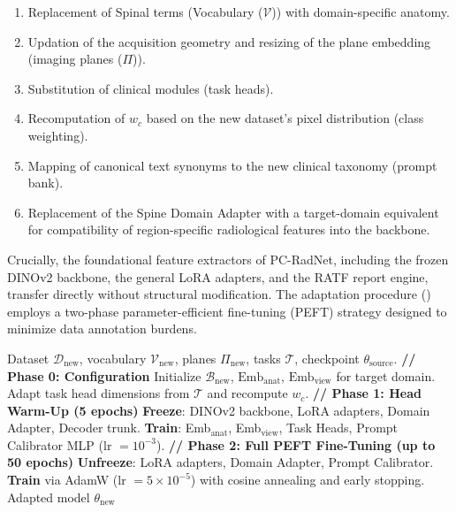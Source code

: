 \documentclass[journal]{IEEEtran}
\newcommand{\modelname}{PC-RadNet}
\begin{document}
\begin{enumerate}[label=(\roman*), leftmargin=*]
    \item Replacement of Spinal terms (Vocabulary ($\mathcal{V}$)) with domain-specific anatomy.
    \item Updation of the acquisition geometry and resizing of the plane embedding (imaging planes ($\Pi$)).
    \item Substitution of clinical modules (task heads).
    \item Recomputation of $w_c$ based on the new dataset's pixel distribution (class weighting).
    \item Mapping of canonical text synonyms to the new clinical taxonomy (prompt bank).
    \item Replacement of the Spine Domain Adapter with a target-domain equivalent for compatibility of region-specific radiological features into the backbone.
\end{enumerate}

Crucially, the foundational feature extractors of \modelname{}, including the frozen DINOv2 backbone, the general LoRA adapters, and the RATF report engine, transfer directly without structural modification. The adaptation procedure () employs a two-phase parameter-efficient fine-tuning (PEFT) strategy designed to minimize data annotation burdens. 

\begin{algorithm}[htbp]
\caption{\modelname{} Domain Adaptation Protocol}
\label{alg:adaptation}
\begin{algorithmic}[1]
\Require Dataset $\mathcal{D}_{\text{new}}$, vocabulary $\mathcal{V}_{\text{new}}$, planes $\Pi_{\text{new}}$, tasks $\mathcal{T}$, checkpoint $\theta_{\text{source}}$.
\State \textbf{// Phase 0: Configuration}
\State Initialize $\mathcal{B}_{\text{new}}$, $\text{Emb}_{\text{anat}}$, $\text{Emb}_{\text{view}}$ for target domain.
\State Adapt task head dimensions from $\mathcal{T}$ and recompute $w_c$.
\State \textbf{// Phase 1: Head Warm-Up (5 epochs)}
\State \textbf{Freeze}: DINOv2 backbone, LoRA adapters, Domain Adapter, Decoder trunk.
\State \textbf{Train}: Emb$_{\text{anat}}$, Emb$_{\text{view}}$, Task Heads, Prompt Calibrator MLP (lr $= 10^{-3}$).
\State \textbf{// Phase 2: Full PEFT Fine-Tuning (up to 50 epochs)}
\State \textbf{Unfreeze}: LoRA adapters, Domain Adapter, Prompt Calibrator.
\State \textbf{Train} via AdamW (lr $= 5 \times 10^{-5}$) with cosine annealing and early stopping.
\State \Return Adapted model $\theta_{\text{new}}$
\end{algorithmic}
\end{algorithm}
\end{document}
